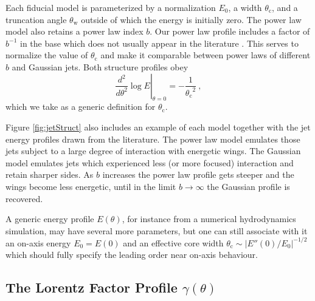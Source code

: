 \documentclass[twocolumn]{aastex62}
\newcommand{\thW}{\ensuremath{\theta_{\mathrm{w}}}}
\newcommand{\thC}{\ensuremath{\theta_{\mathrm{c}}}}
\begin{document}
Each fiducial model is parameterized by a normalization $E_0$, a width $\thC$, and a truncation angle $\thW$ outside of which the energy is initially zero.  The power law model also retains a power law index $b$.     Our power law profile includes a factor of $b^{-1}$ in the base which does not usually appear in the literature \citep{Granot:2003aa, Hotokezaka:2018aa}.  This serves to normalize the value of $\thC$ and make it comparable between power laws of different $b$ and Gaussian jets.  Both structure profiles obey
\begin{equation}
	\left . \frac{d^2}{d\theta^2} \log E \right \rvert_{\theta=0} = -\frac{1}{\thC^2}\ , \label{eq:thCdef}
\end{equation} 
which we take as a generic definition for $\thC$.

Figure \ref{fig:jetStruct} also includes an example of each model together with the jet energy profiles drawn from the literature.  The power law model emulates those jets subject to a large degree of interaction with energetic wings.  The Gaussian model emulates jets which experienced less (or more focused) interaction and retain sharper sides.  As $b$ increases the power law profile gets steeper and the wings become less energetic, until in the limit $b\to \infty$ the Gaussian profile is recovered.

A generic energy profile $E(\theta)$, for instance from a numerical hydrodynamics simulation, may have several more parameters, but one can still associate with it an on-axis energy $E_0 = E(0)$ and an effective core width $\thC \sim |E''(0)/E_0|^{-1/2}$ which should fully specify the leading order near on-axis behaviour.  

\subsection{The Lorentz Factor Profile $\gamma(\theta)$}
\end{document}
